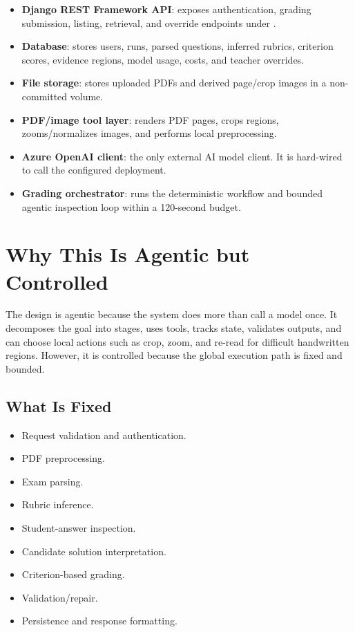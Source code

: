 \documentclass[11pt,a4paper]{article}
\newcommand{\code}[1]{\texttt{\detokenize{#1}}}
\begin{document}
\begin{itemize}[leftmargin=*]
  \item \textbf{Django REST Framework API}: exposes authentication, grading submission, listing, retrieval, and override endpoints under \code{/api}.
  \item \textbf{Database}: stores users, runs, parsed questions, inferred rubrics, criterion scores, evidence regions, model usage, costs, and teacher overrides.
  \item \textbf{File storage}: stores uploaded PDFs and derived page/crop images in a non-committed volume.
  \item \textbf{PDF/image tool layer}: renders PDF pages, crops regions, zooms/normalizes images, and performs local preprocessing.
  \item \textbf{Azure OpenAI client}: the only external AI model client. It is hard-wired to call the configured \code{gpt-5.4-mini} deployment.
  \item \textbf{Grading orchestrator}: runs the deterministic workflow and bounded agentic inspection loop within a 120-second budget.
\end{itemize}

\section{Why This Is Agentic but Controlled}

The design is agentic because the system does more than call a model once. It decomposes the goal into stages, uses tools, tracks state, validates outputs, and can choose local actions such as crop, zoom, and re-read for difficult handwritten regions. However, it is controlled because the global execution path is fixed and bounded.

\subsection{What Is Fixed}

\begin{itemize}[leftmargin=*]
  \item Request validation and authentication.
  \item PDF preprocessing.
  \item Exam parsing.
  \item Rubric inference.
  \item Student-answer inspection.
  \item Candidate solution interpretation.
  \item Criterion-based grading.
  \item Validation/repair.
  \item Persistence and response formatting.
\end{itemize}
\end{document}
